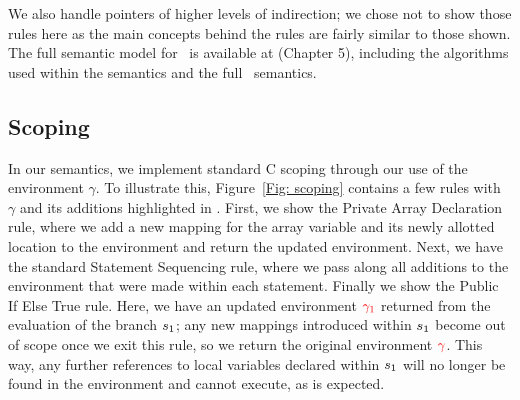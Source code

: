 We also handle pointers of higher levels of indirection; we chose not to show those rules here as the main concepts behind the rules are fairly similar to those shown. 
The full semantic model for \piccoC\ is available at \cite{amys-dissertation} (Chapter 5), including the algorithms used within the semantics and the full \vanillaC\ semantics. 



\subsection{Scoping}
In our semantics, we implement standard C scoping through our use of the environment $\gamma$. 
To illustrate this, Figure~\ref{Fig: scoping} contains a few rules with $\gamma$ and its additions highlighted in . 
First, we show the Private Array Declaration rule, where we add a new mapping for the array variable and its newly allotted location to the environment and return the updated environment. 
Next, we have the standard Statement Sequencing rule, where we pass along all additions to the environment that were made within each statement. 
Finally we show the Public If Else True rule. Here, we have an updated environment $\textcolor{red}{\gamma_1}$ returned from the evaluation of the  branch $s_1$; any new mappings introduced within $s_1$ become out of scope once we exit this rule, so we return the original environment $\textcolor{red}{\gamma}$. This way, any further references to local variables declared within $s_1$ will no longer be found in the environment and cannot execute, as is expected. 



